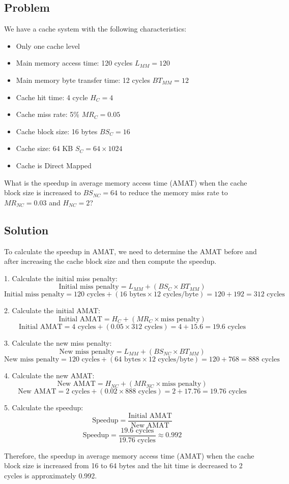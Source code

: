 \subsection*{Problem}

We have a cache system with the following characteristics:
\begin{itemize}
    \item Only one cache level
    \item Main memory access time: 120 cycles $L_{MM}=120$
    \item Main memory byte transfer time: 12 cycles $BT_{MM}=12$
    \item Cache hit time: 4 cycle $H_{C}=4$
    \item Cache miss rate: 5\% $MR_{C}=0.05$
    \item Cache block size: 16 bytes $BS_{C}=16$
    \item Cache size: 64 KB $S_{C}=64 \times 1024$
    \item Cache is Direct Mapped
\end{itemize}
What is the speedup in average memory access time (AMAT) when the cache block size is increased to $BS_{NC}=64$ to reduce the memory miss rate to $MR_{NC}=0.03$ and $H_{NC}=2$?

\subsection*{Solution}

To calculate the speedup in AMAT, we need to determine the AMAT before and after increasing the cache block size
and then compute the speedup.

1. Calculate the initial miss penalty:
\[
\text{Initial miss penalty} = L_{MM} + \left(BS_{C} \times BT_{MM}\right)
\]
\[
\text{Initial miss penalty} = 120 \text{ cycles} + \left(16 \text{ bytes} \times 12 \text{ cycles/byte}\right) = 120 + 192 = 312 \text{ cycles}
\]

2. Calculate the initial AMAT:
\[
\text{Initial AMAT} = H_{C} + (MR_{C} \times \text{miss penalty})
\]
\[
\text{Initial AMAT} = 4 \text{ cycles} + (0.05 \times 312 \text{ cycles}) = 4 + 15.6 = 19.6 \text{ cycles}
\]

3. Calculate the new miss penalty:
\[
\text{New miss penalty} = L_{MM} + \left(BS_{NC} \times BT_{MM}\right)
\]
\[
\text{New miss penalty} = 120 \text{ cycles} + \left(64 \text{ bytes} \times 12 \text{ cycles/byte}\right) = 120 + 768 = 888 \text{ cycles}
\]

4. Calculate the new AMAT:
\[
\text{New AMAT} = H_{NC} + (MR_{NC} \times \text{miss penalty})
\]
\[
\text{New AMAT} = 2 \text{ cycles} + (0.02 \times 888 \text{ cycles}) = 2 + 17.76 = 19.76 \text{ cycles}
\]

5. Calculate the speedup:
\[
\text{Speedup} = \frac{\text{Initial AMAT}}{\text{New AMAT}}
\]
\[
\text{Speedup} = \frac{19.6 \text{ cycles}}{19.76 \text{ cycles}} \approx 0.992
\]

Therefore, the speedup in average memory access time (AMAT) when the cache block size is increased from 16 to 64 bytes and the hit time is decreased to 2 cycles is approximately 0.992.
